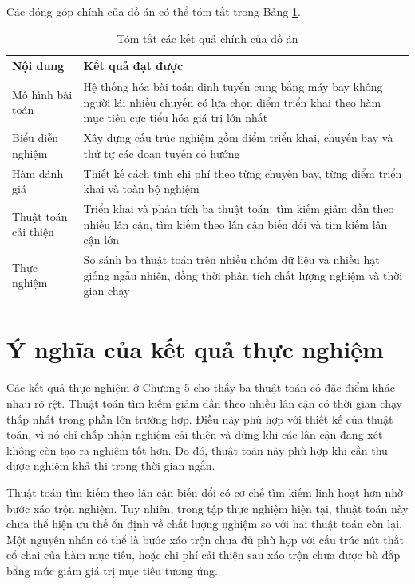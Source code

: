 Các đóng góp chính của đồ án có thể tóm tắt trong Bảng \ref{tab:chapter6-contributions}.

\begin{table}[H]
\centering
\caption{Tóm tắt các kết quả chính của đồ án}
\label{tab:chapter6-contributions}
\begin{tabular}{|p{4.2cm}|p{9.2cm}|}
\hline
\textbf{Nội dung} & \textbf{Kết quả đạt được} \\
\hline
Mô hình bài toán & Hệ thống hóa bài toán định tuyến cung bằng máy bay không người lái nhiều chuyến có lựa chọn điểm triển khai theo hàm mục tiêu cực tiểu hóa giá trị lớn nhất \\
\hline
Biểu diễn nghiệm & Xây dựng cấu trúc nghiệm gồm điểm triển khai, chuyến bay và thứ tự các đoạn tuyến có hướng \\
\hline
Hàm đánh giá & Thiết kế cách tính chi phí theo từng chuyến bay, từng điểm triển khai và toàn bộ nghiệm \\
\hline
Thuật toán cải thiện & Triển khai và phân tích ba thuật toán: tìm kiếm giảm dần theo nhiều lân cận, tìm kiếm theo lân cận biến đổi và tìm kiếm lân cận lớn \\
\hline
Thực nghiệm & So sánh ba thuật toán trên nhiều nhóm dữ liệu và nhiều hạt giống ngẫu nhiên, đồng thời phân tích chất lượng nghiệm và thời gian chạy \\
\hline
\end{tabular}
\end{table}

\section{Ý nghĩa của kết quả thực nghiệm}

Các kết quả thực nghiệm ở Chương 5 cho thấy ba thuật toán có đặc điểm khác nhau rõ rệt. Thuật toán tìm kiếm giảm dần theo nhiều lân cận có thời gian chạy thấp nhất trong phần lớn trường hợp. Điều này phù hợp với thiết kế của thuật toán, vì nó chỉ chấp nhận nghiệm cải thiện và dừng khi các lân cận đang xét không còn tạo ra nghiệm tốt hơn. Do đó, thuật toán này phù hợp khi cần thu được nghiệm khả thi trong thời gian ngắn.

Thuật toán tìm kiếm theo lân cận biến đổi có cơ chế tìm kiếm linh hoạt hơn nhờ bước xáo trộn nghiệm. Tuy nhiên, trong tập thực nghiệm hiện tại, thuật toán này chưa thể hiện ưu thế ổn định về chất lượng nghiệm so với hai thuật toán còn lại. Một nguyên nhân có thể là bước xáo trộn chưa đủ phù hợp với cấu trúc nút thắt cổ chai của hàm mục tiêu, hoặc chi phí cải thiện sau xáo trộn chưa được bù đắp bằng mức giảm giá trị mục tiêu tương ứng.


